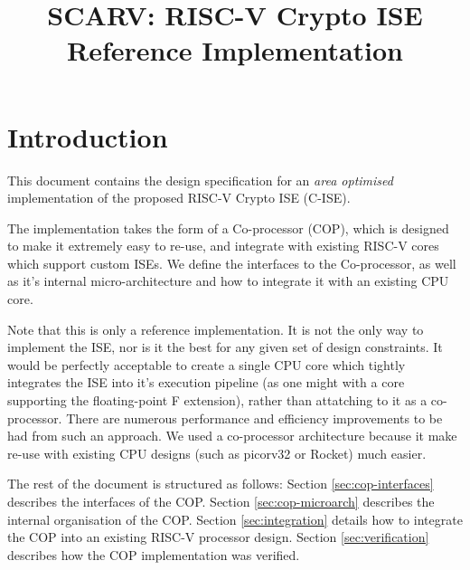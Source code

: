 \documentclass{article}
\title{SCARV: RISC-V Crypto ISE \\ Reference Implementation}
\begin{document}

\newcommand{\SIGNALI}[3]{\paragraph{\bf Input :} {\tt #2} ($#1$) - {#3}}
\newcommand{\SIGNALO}[3]{\paragraph{\bf Output:} {\tt #2} ($#1$) - {#3}}


\maketitle

\tableofcontents

\section{Introduction}

This document contains the design specification for an {\em area optimised}
implementation of the proposed RISC-V Crypto ISE (C-ISE).

The implementation takes the form of a Co-processor (COP), which is designed
to make it extremely easy to re-use, and integrate with existing RISC-V cores
which support custom ISEs. We define the interfaces to the Co-processor, as
well as it's internal micro-architecture and how to integrate it with an
existing CPU core.

Note that this is only a reference implementation. It is not the only way
to implement the ISE, nor is it the best for any given set of design
constraints. It would be perfectly acceptable to create a single CPU core
which tightly integrates the ISE into it's execution pipeline (as one might
with a core supporting the floating-point F extension), rather than
attatching to it as a co-processor. There are numerous performance and
efficiency improvements to be had from such an approach. We used a
co-processor architecture because it make re-use with existing CPU designs
(such as picorv32 or Rocket) much easier.

The rest of the document is structured as follows: Section 
\ref{sec:cop-interfaces} describes the interfaces of the COP. Section
\ref{sec:cop-microarch} describes the internal organisation of the COP.
Section \ref{sec:integration} details how to integrate the COP into an
existing RISC-V processor design. Section \ref{sec:verification} describes
how the COP implementation was verified.
\end{document}
